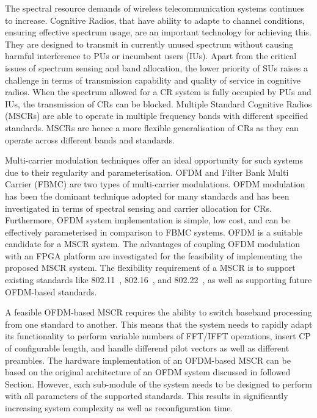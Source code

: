 The spectral resource demands of wireless telecommunication systems continues to increase.
Cognitive Radios, that have ability to adapte to channel conditions, ensuring effective spectrum usage, are an important technology for achieving this.
They are designed to transmit in currently unused spectrum without causing harmful interference to PUs or incumbent users (IUs).
Apart from the critical issues of spectrum sensing and band allocation, the lower priority of SUs raises a challenge in terms of transmission capability and quality of service in cognitive radios.
When the spectrum allowed for a CR system is fully occupied by PUs and IUs, the transmission of CRs can be blocked.
Multiple Standard Cognitive Radios (MSCRs) are able to operate in multiple frequency bands with different specified standards.
MSCRs are hence a more flexible generalisation of CRs as they can operate across different bands and standards.

Multi-carrier modulation techniques offer an ideal opportunity for such systems due to their regularity and parameterisation. OFDM and Filter Bank Multi Carrier (FBMC) are two types of multi-carrier modulations. OFDM modulation has been the dominant technique adopted for many standards and has been investigated in terms of spectral sensing and carrier allocation for CRs.
Furthermore, OFDM system implementation is simple, low cost, and can be effectively parameterised in comparison to FBMC systems. OFDM is a suitable candidate for a MSCR system. The advantages of coupling OFDM modulation with an FPGA platform are investigated for the feasibility of implementing the proposed MSCR system.
The flexibility requirement of a MSCR is to support existing standards like 802.11~\cite{IEEE80211}, 802.16~\cite{IEEE80216}, and 802.22~\cite{IEEE80222}, as well as supporting future OFDM-based standards.

A feasible OFDM-based MSCR requires the ability to switch baseband processing from one standard to another. This means that the system needs to rapidly adapt its functionality to perform variable numbers of FFT/IFFT operations, insert CP of configurable length, and handle differend pilot vectors as well as different preambles. The hardware implementation of an OFDM-based MSCR can be based on the original architecture of an OFDM system discussed in followed Section. However, each sub-module of the system needs to be designed to perform with all parameters of the supported standards. This results in significantly increasing system complexity as well as reconfiguration time.

